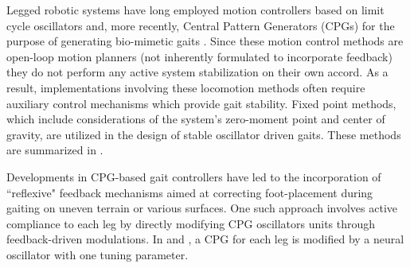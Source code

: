 
Legged robotic systems have long employed motion controllers based on limit cycle oscillators and, more recently, 
Central Pattern Generators (CPGs)  for the purpose of generating bio-mimetic gaits 
\cite{Matsuoka1985,Collins1993,Endo2004,Righetti2006,Ijspeert2008,Matos2010,Ajallooeian2013,Park2014,Fukuoka2015}. 
Since these motion control methods are open-loop motion planners (\IE not inherently formulated to incorporate feedback) 
they do not perform any active system stabilization on their own accord. As a result, implementations involving these  
locomotion methods often require auxiliary control mechanisms which provide gait stability. Fixed point methods,
which include considerations of the system's zero-moment point and center of gravity, are utilized in the design of
stable oscillator driven gaits. These methods are summarized in \cite{Wieber2015}. %

Developments in CPG-based gait controllers have led to the incorporation of ``reflexive" feedback
mechanisms aimed at correcting foot-placement during gaiting on uneven terrain or various surfaces. One such approach
involves active compliance to each leg by directly modifying CPG oscillators units through feedback-driven 
modulations. In  \cite{Fukuoka2003} and \cite{Endo2004}, a CPG for each leg is modified by a neural oscillator 
with one tuning parameter.  


